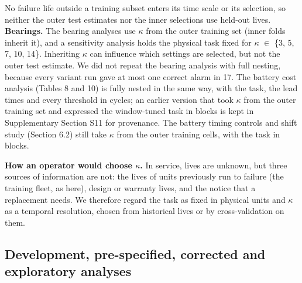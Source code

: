 \documentclass[a4paper,fleqn,doubleblind]{cas-dc}
\begin{document}
No failure life outside a training subset enters its time scale or its selection, so neither the outer test estimates nor the inner selections use held-out lives. \textbf{Bearings.} The bearing analyses use $\kappa$ from the outer training set (inner folds inherit it), and a sensitivity analysis holds the physical task fixed for $\kappa$ $\in$ \{3, 5, 7, 10, 14\}. Inheriting $\kappa$ can influence which settings are selected, but not the outer test estimate. We did not repeat the bearing analysis with full nesting, because every variant run gave at most one correct alarm in 17. The battery cost analysis (Tables 8 and 10) is fully nested in the same way, with the task, the lead times and every threshold in cycles; an earlier version that took $\kappa$ from the outer training set and expressed the window-tuned task in blocks is kept in Supplementary Section S11 for provenance. The battery timing controls and shift study (Section 6.2) still take $\kappa$ from the outer training cells, with the task in blocks.

\textbf{How an operator would choose $\kappa$.} In service, lives are unknown, but three sources of information are not: the lives of units previously run to failure (the training fleet, as here), design or warranty lives, and the notice that a replacement needs. We therefore regard the task as fixed in physical units and $\kappa$ as a temporal resolution, chosen from historical lives or by cross-validation on them.

\subsection{Development, pre-specified, corrected and exploratory analyses}
\end{document}
